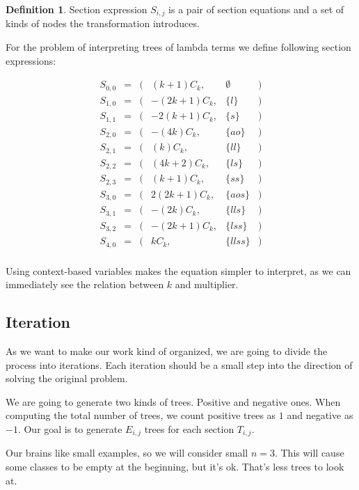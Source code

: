 \documentclass[final]{article}
\theoremstyle{definition}
\newtheorem{definition}{Definition}[subsection]
\theoremstyle{definition}
\theoremstyle{remark}
\begin{document}
\begin{definition}
    Section expression \(S_{i, j}\) is a pair of section equations and a set of kinds of nodes the transformation introduces.
\end{definition}

For the problem of interpreting trees of lambda terms we define following section expressions:

\[\begin{array}{rccrlc}
        S_{0,0} &=& (& (k + 1) C_k,& \emptyset &)\\
        S_{1,0} &=& (& - (2 k + 1) C_k,& \{l\} &)\\
        S_{1,1} &=& (& - 2 (k + 1) C_k,& \{s\} &)\\
        S_{2,0} &=& (& - (4 k) C_k,& \{ao\} &)\\
        S_{2,1} &=& (& (k) C_k,& \{ll\} &)\\
        S_{2,2} &=& (& (4 k + 2) C_k,& \{ls\} &)\\
        S_{2,3} &=& (& (k + 1) C_k,& \{ss\} &)\\
        S_{3,0} &=& (& 2 (2 k + 1) C_k,& \{aos\} &)\\
        S_{3,1} &=& (& - (2 k) C_k,& \{lls\} &)\\
        S_{3,2} &=& (& - (2 k + 1) C_k,& \{lss\} &)\\
        S_{4,0} &=& (& k C_k,& \{llss\} &)\\
\end{array}\]

Using context-based variables makes the equation simpler to interpret, as we can immediately see the relation between \(k\) and multiplier.

\subsection{Iteration}%
\label{sub:iteration}

As we want to make our work kind of organized, we are going to divide the process into iterations. Each iteration should be a small step into the direction of solving the original problem.

We are going to generate two kinds of trees. Positive and negative ones. When computing the total number of trees, we count positive trees as \(1\) and negative as \(-1\). Our goal is to generate \(E_{i, j}\) trees for each section \(T_{i, j}\).

Our brains like small examples, so we will consider small \(n = 3\). This will cause some classes to be empty at the beginning, but it's ok. That's less trees to look at.
\end{document}
